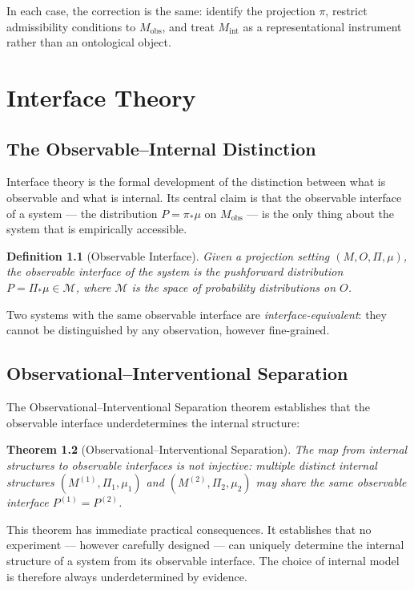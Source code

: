 \documentclass[12pt,a4paper]{book}
\newtheorem{theorem}{Theorem}[chapter]
\newtheorem{definition}[theorem]{Definition}
\theoremstyle{remark}
\theoremstyle{definition}
\begin{document}
In each case, the correction is the same: identify the projection $\pi$,
restrict admissibility conditions to $M_{\mathrm{obs}}$, and treat
$M_{\mathrm{int}}$ as a representational instrument rather than an
ontological object.

\chapter{Interface Theory}

\section{The Observable--Internal Distinction}

Interface theory is the formal development of the distinction between
what is observable and what is internal. Its central claim is that the
observable interface of a system --- the distribution $P = \pi_*\mu$ on
$M_{\mathrm{obs}}$ --- is the only thing about the system that is
empirically accessible.

\begin{definition}[Observable Interface]
Given a projection setting $(M, O, \Pi, \mu)$, the \emph{observable
interface} of the system is the pushforward distribution
$P = \Pi_*\mu \in \mathcal{M}$, where $\mathcal{M}$ is the space of
probability distributions on $O$.
\end{definition}

Two systems with the same observable interface are \emph{interface-equivalent}:
they cannot be distinguished by any observation, however fine-grained.

\section{Observational--Interventional Separation}

The Observational--Interventional Separation theorem establishes that the
observable interface underdetermines the internal structure:

\begin{theorem}[Observational--Interventional Separation]
The map from internal structures to observable interfaces is not injective:
multiple distinct internal structures $(M^{(1)}, \Pi_1, \mu_1)$ and
$(M^{(2)}, \Pi_2, \mu_2)$ may share the same observable interface
$P^{(1)} = P^{(2)}$.
\end{theorem}

This theorem has immediate practical consequences. It establishes that
no experiment --- however carefully designed --- can uniquely determine
the internal structure of a system from its observable interface. The
choice of internal model is therefore always underdetermined by evidence.
\end{document}
